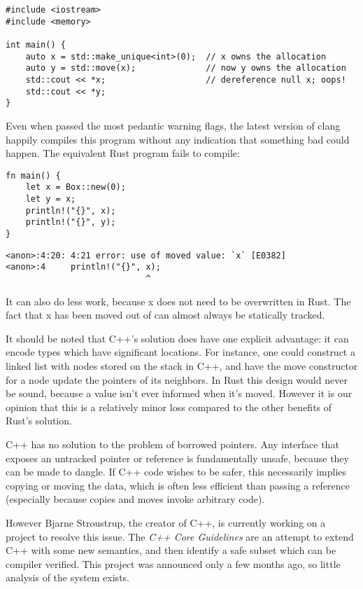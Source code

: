 \begin{verbatim}
#include <iostream>
#include <memory>

int main() {
    auto x = std::make_unique<int>(0);  // x owns the allocation
    auto y = std::move(x);              // now y owns the allocation
    std::cout << *x;                    // dereference null x; oops!
    std::cout << *y;
}
\end{verbatim}

Even when passed the most pedantic warning flags, the latest version of clang
happily compiles this program without any indication that something bad could
happen. The equivalent Rust program fails to compile:

\begin{verbatim}
fn main() {
    let x = Box::new(0);
    let y = x;
    println!("{}", x);
    println!("{}", y);
}
\end{verbatim}

\begin{verbatim}
<anon>:4:20: 4:21 error: use of moved value: `x` [E0382]
<anon>:4     println!("{}", x);
                            ^
\end{verbatim}

It can also do less work, because x does not need to be overwritten in
Rust. The fact that x has been moved out of can almost always be statically
tracked.

It should be noted that C++'s solution does have one explicit advantage: it
can encode types which have significant locations. For instance, one could
construct a linked list with nodes stored on the stack in C++, and have the
move constructor for a node update the pointers of its neighbors. In Rust
this design would never be sound, because a value isn't ever informed when it's
moved. However it is our opinion that this is a relatively minor loss compared
to the other benefits of Rust's solution.

C++ has no solution to the problem of borrowed pointers. Any interface that
exposes an untracked pointer or reference is fundamentally unsafe, because they
can be made to dangle. If C++ code wishes to be safer, this necessarily implies
copying or moving the data, which is often less efficient than passing a reference
(especially because copies and moves invoke arbitrary code).

However Bjarne Stroustrup, the creator of C++, is currently working on a project
to resolve this issue. The \emph{C++ Core Guidelines} \cite{cppcore} are an attempt to extend
C++ with some new semantics, and then identify a safe subset which can be compiler
verified. This project was announced only a few months ago, so little analysis of the
system exists.

